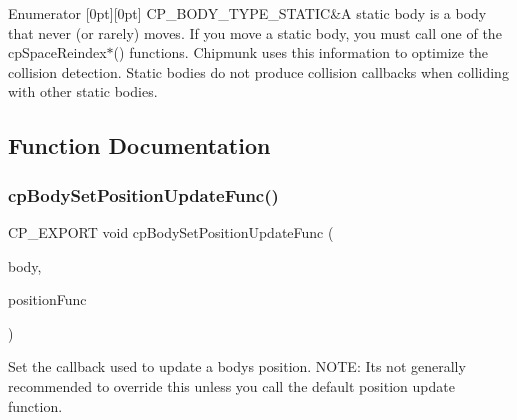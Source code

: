 \begin{DoxyEnumFields}{Enumerator}
[0pt][0pt]{}\mbox{\label{group__cpBody_gga3581b128fd3e2734952aeac8545fd5caaa594879f082bbabce4bd16944f73456b}} 
C\+P\+\_\+\+B\+O\+D\+Y\+\_\+\+T\+Y\+P\+E\+\_\+\+S\+T\+A\+T\+IC&A static body is a body that never (or rarely) moves. If you move a static body, you must call one of the cp\+Space\+Reindex$\ast$() functions. Chipmunk uses this information to optimize the collision detection. Static bodies do not produce collision callbacks when colliding with other static bodies. \\
\hline

\end{DoxyEnumFields}


\subsection{Function Documentation}
\mbox{\label{group__cpBody_gaa3c5a0ad4bfa91f4e24fb558c743fdba}} 
\subsubsection{\texorpdfstring{cp\+Body\+Set\+Position\+Update\+Func()}{cpBodySetPositionUpdateFunc()}}
{\footnotesize\ttfamily C\+P\+\_\+\+E\+X\+P\+O\+RT void cp\+Body\+Set\+Position\+Update\+Func (\begin{DoxyParamCaption}\item[{\hyperlink{structcpBody}{cp\+Body} $\ast$}]{body,  }\item[{\hyperlink{group__cpBody_ga3386e3b0b4156289ab6099cc64c952e7}{cp\+Body\+Position\+Func}}]{position\+Func }\end{DoxyParamCaption})}

Set the callback used to update a body\textquotesingle{}s position. N\+O\+TE\+: It\textquotesingle{}s not generally recommended to override this unless you call the default position update function. 
